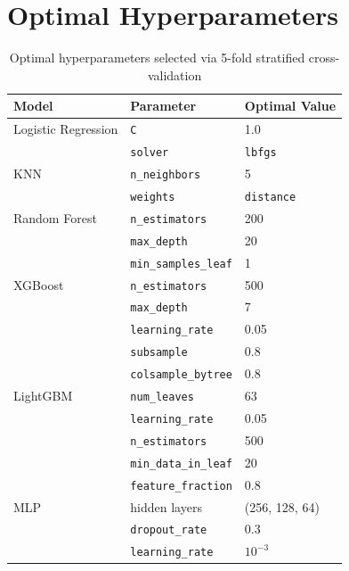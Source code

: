\section{Optimal Hyperparameters}

\begin{table}[H]
\centering
\caption{Optimal hyperparameters selected via 5-fold stratified cross-validation}
\label{tab:optimal_hp}
\begin{tabular}{lll}
\toprule
\textbf{Model} & \textbf{Parameter} & \textbf{Optimal Value} \\
\midrule
Logistic Regression & \texttt{C}                  & 1.0 \\
                    & \texttt{solver}             & \texttt{lbfgs} \\
\midrule
KNN                 & \texttt{n\_neighbors}       & 5 \\
                    & \texttt{weights}            & \texttt{distance} \\
\midrule
Random Forest       & \texttt{n\_estimators}      & 200 \\
                    & \texttt{max\_depth}         & 20 \\
                    & \texttt{min\_samples\_leaf} & 1 \\
\midrule
XGBoost             & \texttt{n\_estimators}      & 500 \\
                    & \texttt{max\_depth}         & 7 \\
                    & \texttt{learning\_rate}     & 0.05 \\
                    & \texttt{subsample}          & 0.8 \\
                    & \texttt{colsample\_bytree}  & 0.8 \\
\midrule
LightGBM            & \texttt{num\_leaves}        & 63 \\
                    & \texttt{learning\_rate}     & 0.05 \\
                    & \texttt{n\_estimators}      & 500 \\
                    & \texttt{min\_data\_in\_leaf} & 20 \\
                    & \texttt{feature\_fraction}  & 0.8 \\
\midrule
MLP                 & hidden layers               & (256, 128, 64) \\
                    & \texttt{dropout\_rate}      & 0.3 \\
                    & \texttt{learning\_rate}     & $10^{-3}$ \\
\bottomrule
\end{tabular}
\end{table}

